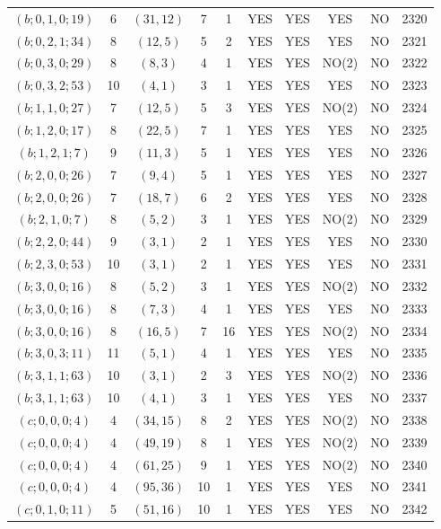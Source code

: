 \begin{longtable}{|c|c|c|c|c|c|c|c|c|c|}
$(b; 0, 1, 0; 19)$ & 6 & $(31, 12)$ & 7 & 1 & YES & YES & YES & NO & 2320\\
$(b; 0, 2, 1; 34)$ & 8 & $(12, 5)$ & 5 & 2 & YES & YES & YES & NO & 2321\\
$(b; 0, 3, 0; 29)$ & 8 & $(8, 3)$ & 4 & 1 & YES & YES & NO(2) & NO & 2322\\
$(b; 0, 3, 2; 53)$ & 10 & $(4, 1)$ & 3 & 1 & YES & YES & YES & NO & 2323\\
$(b; 1, 1, 0; 27)$ & 7 & $(12, 5)$ & 5 & 3 & YES & YES & NO(2) & NO & 2324\\
$(b; 1, 2, 0; 17)$ & 8 & $(22, 5)$ & 7 & 1 & YES & YES & YES & NO & 2325\\
$(b; 1, 2, 1; 7)$ & 9 & $(11, 3)$ & 5 & 1 & YES & YES & YES & NO & 2326\\
$(b; 2, 0, 0; 26)$ & 7 & $(9, 4)$ & 5 & 1 & YES & YES & YES & NO & 2327\\
$(b; 2, 0, 0; 26)$ & 7 & $(18, 7)$ & 6 & 2 & YES & YES & YES & NO & 2328\\
$(b; 2, 1, 0; 7)$ & 8 & $(5, 2)$ & 3 & 1 & YES & YES & NO(2) & NO & 2329\\
$(b; 2, 2, 0; 44)$ & 9 & $(3, 1)$ & 2 & 1 & YES & YES & YES & NO & 2330\\
$(b; 2, 3, 0; 53)$ & 10 & $(3, 1)$ & 2 & 1 & YES & YES & YES & NO & 2331\\
$(b; 3, 0, 0; 16)$ & 8 & $(5, 2)$ & 3 & 1 & YES & YES & NO(2) & NO & 2332\\
$(b; 3, 0, 0; 16)$ & 8 & $(7, 3)$ & 4 & 1 & YES & YES & YES & NO & 2333\\
$(b; 3, 0, 0; 16)$ & 8 & $(16, 5)$ & 7 & 16 & YES & YES & NO(2) & NO & 2334\\
$(b; 3, 0, 3; 11)$ & 11 & $(5, 1)$ & 4 & 1 & YES & YES & YES & NO & 2335\\
$(b; 3, 1, 1; 63)$ & 10 & $(3, 1)$ & 2 & 3 & YES & YES & NO(2) & NO & 2336\\
$(b; 3, 1, 1; 63)$ & 10 & $(4, 1)$ & 3 & 1 & YES & YES & YES & NO & 2337\\
$(c; 0, 0, 0; 4)$ & 4 & $(34, 15)$ & 8 & 2 & YES & YES & NO(2) & NO & 2338\\
$(c; 0, 0, 0; 4)$ & 4 & $(49, 19)$ & 8 & 1 & YES & YES & NO(2) & NO & 2339\\
$(c; 0, 0, 0; 4)$ & 4 & $(61, 25)$ & 9 & 1 & YES & YES & NO(2) & NO & 2340\\
$(c; 0, 0, 0; 4)$ & 4 & $(95, 36)$ & 10 & 1 & YES & YES & YES & NO & 2341\\
$(c; 0, 1, 0; 11)$ & 5 & $(51, 16)$ & 10 & 1 & YES & YES & YES & NO & 2342\\

\end{longtable}
